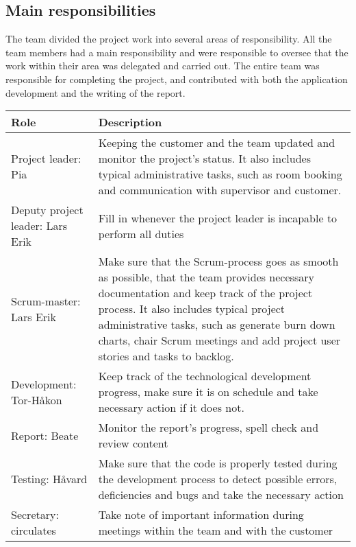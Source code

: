 \newpage
\subsection{Main responsibilities}

The team divided the project work into several areas of responsibility. All the team members had a main responsibility and were responsible to oversee that the work within their area was delegated and carried out. The entire team was responsible for completing the project, and contributed with both the application development and the writing of the report.


\begin{table}[H]
\centering
{}
\begin{tabular}{|l|p{9.7cm}|}
\hline
\textbf{Role} & \textbf{Description}\\\hline
Project leader: Pia & Keeping the customer and the team updated and monitor the project's status. It also includes typical administrative tasks, such as room booking and communication with supervisor and customer.\\\hline
Deputy project leader: Lars Erik & Fill in whenever the project leader is incapable to perform all duties\\\hline
Scrum-master: Lars Erik & Make sure that the Scrum-process goes as smooth as possible, that the team provides necessary documentation and keep track of the project process. It also includes typical project administrative tasks, such as generate burn down charts, chair Scrum meetings and add project user stories and tasks to backlog.\\\hline
Development: Tor-Håkon & Keep track of the technological development progress, make sure it is on schedule and take necessary action if it does not.\\\hline
Report: Beate & Monitor the report's progress, spell check and review content\\\hline
Testing: Håvard & Make sure that the code is properly tested during the development process to detect possible errors, deficiencies and bugs and take the necessary action \\\hline
Secretary: circulates & Take note of important information during meetings within the team and with the customer\\\hline
\end{tabular}
\end{table}
